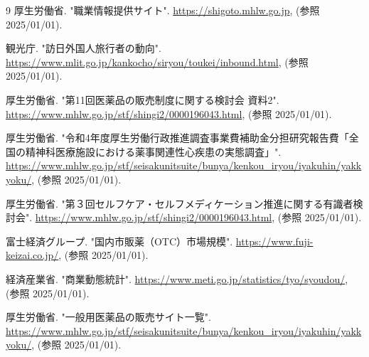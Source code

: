 \documentclass[a4paper,11pt]{bxjsarticle}
\theoremstyle{definition}
\begin{document}
\newpage
\begin{thebibliography}{9}
厚生労働省. "職業情報提供サイト". 
\url{https://shigoto.mhlw.go.jp}, (参照 2025/01/01).

観光庁. "訪日外国人旅行者の動向". 
\url{https://www.mlit.go.jp/kankocho/siryou/toukei/inbound.html}, (参照 2025/01/01).

厚生労働省. "第11回医薬品の販売制度に関する検討会 資料2". 
\url{https://www.mhlw.go.jp/stf/shingi2/0000196043.html}, (参照 2025/01/01).

厚生労働省. "令和4年度厚生労働行政推進調査事業費補助金分担研究報告費「全国の精神科医療施設における薬事関連性心疾患の実態調査」". 
\url{https://www.mhlw.go.jp/stf/seisakunitsuite/bunya/kenkou_iryou/iyakuhin/yakkyoku/}, (参照 2025/01/01).

厚生労働省. "第３回セルフケア・セルフメディケーション推進に関する有識者検討会". 
\url{https://www.mhlw.go.jp/stf/shingi2/0000196043.html}, (参照 2025/01/01).

富士経済グループ. "国内市販薬（OTC）市場規模". 
\url{https://www.fuji-keizai.co.jp/}, (参照 2025/01/01).

経済産業省. "商業動態統計". 
\url{https://www.meti.go.jp/statistics/tyo/syoudou/}, (参照 2025/01/01).

厚生労働省. "一般用医薬品の販売サイト一覧". 
\url{https://www.mhlw.go.jp/stf/seisakunitsuite/bunya/kenkou_iryou/iyakuhin/yakkyoku/}, (参照 2025/01/01).

\end{thebibliography}
\end{document}
